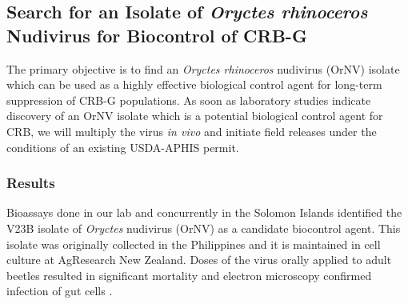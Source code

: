 \documentclass[12pt,letterpaper,english,bibliography=totocnumbered,abstract=on]{scrartcl}
\begin{document}
\subsection{Search for an Isolate of \textit{Oryctes rhinoceros} Nudivirus for Biocontrol of CRB-G}

\begin{framed}
The primary objective is to find an \textit{Oryctes rhinoceros} nudivirus (OrNV) isolate which can be used as a highly effective biological control agent for long-term suppression of CRB-G populations. As soon as laboratory studies indicate discovery of an OrNV isolate which is a potential biological control agent for CRB, we will multiply the virus \textit{in vivo} and initiate field releases under the conditions of an existing USDA-APHIS permit.
\end{framed}

\subsubsection{Results}
Bioassays done in our lab and concurrently in the Solomon Islands identified the V23B isolate of \emph{Oryctes} nudivirus (OrNV) as a candidate biocontrol agent. This isolate was originally collected in the Philippines and it is maintained in cell culture at AgResearch New Zealand. Doses of the virus orally applied to adult beetles resulted in significant mortality and electron microscopy confirmed infection of gut cells \cite{barreraElectronMicroscopyStudy2021a}.   
\end{document}
